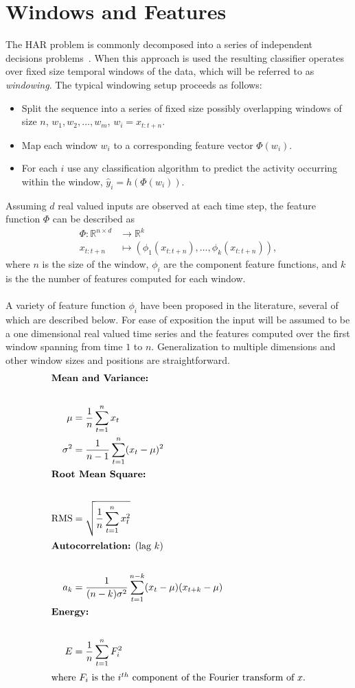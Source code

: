 \documentclass[12pt]{report}
\newcommand{\1}[0]{\mathbbm{1}}
\newcommand{\seq}[3]{\ensuremath{#1_{{#2}:{#3}}}}
\begin{document}
\section{Windows and Features}
\label{sec:HAR Windows and Features}
The \ac{HAR} problem is commonly decomposed into a series of independent decisions
problems~\cite{assembly-activity,tutorial-bulling,ms-activity,phone-kwapisz}.
When this approach is used the resulting classifier operates over fixed size temporal
windows of the data, which will be referred to as \emph{windowing}.
The typical windowing setup proceeds as follows:
\begin{itemize}
    \item Split the sequence into a series of fixed size possibly overlapping windows
          of size $n$, $w_1, w_2, \ldots, w_m$, $w_i = \seq{x}{t}{t + n}$.
    \item Map each window $w_i$ to a corresponding feature vector $\Phi(w_i)$.
    \item For each $i$ use any classification algorithm to predict the activity occurring
          within the window, $\hat{y}_i = h(\Phi(w_i))$.
\end{itemize}
Assuming $d$ real valued inputs are observed at each time step, the feature function $\Phi$
can be described as
\begin{align*}
    \Phi \colon \mathbb{R}^{n \times d} & \longrightarrow \mathbb{R}^{k}\\
    \seq{x}{t}{t + n} & \longmapsto (\phi_1(\seq{x}{t}{t + n}), \ldots, \phi_k(\seq{x}{t}{t + n})),
\end{align*}
where $n$ is the size of the window, $\phi_i$ are the component feature functions,
and $k$ is the the number of features computed for each window.
\\\\
A variety of feature function $\phi_i$ have been proposed in the literature,
several of which are described below. For ease of exposition the input
will be assumed to be a one dimensional real valued time series and the features computed
over the first window spanning from time $1$ to $n$. Generalization to multiple dimensions
and other window sizes and positions are straightforward.
\begin{align*}
    \intertext{\textbf{Mean and Variance:}} \\
    \mu &= \frac{1}{n}\sum_{t=1}^n x_t \\
    \sigma^2 &= \frac{1}{n-1} \sum_{t=1}^n (x_t - \mu)^2 \\
    \intertext{\textbf{Root Mean Square:}} \\
    \text{RMS} &= \sqrt{\frac{1}{n} \sum_{t=1}^n x_t^2} \\
    \intertext{\textbf{Autocorrelation:} (lag $k$)} \\
    a_k &= \frac{1}{(n-k)\sigma^2} \sum_{t=1}^{n-k}(x_t - \mu)(x_{t+k} - \mu) \\
    \intertext{\textbf{Energy:}} \\
    E &= \frac{1}{n} \sum_{t=1}^n F_i^2\\
    \intertext{where $F_i$ is the $i^{th}$ component of the Fourier transform of $x$.}
\end{align*}
\end{document}
